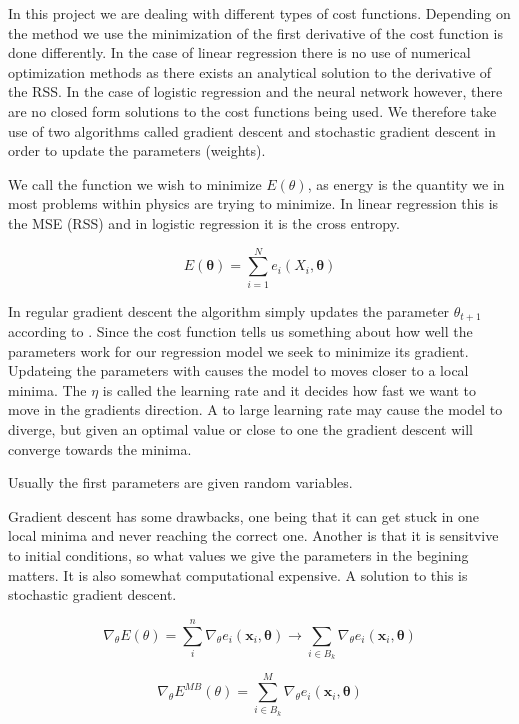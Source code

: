 In this project we are dealing with different types of cost functions. Depending on the method we use the minimization of the first derivative of the cost function is done differently. In the case of linear regression there is no use of numerical optimization methods as there exists an analytical solution to the derivative of the RSS. In the case of logistic regression and the neural network however, there are no closed form solutions to the cost functions being used. We therefore take use of two algorithms called gradient descent and stochastic gradient descent in order to update the parameters (weights).

We call the function we wish to minimize $E(\theta)$, as energy is the quantity we in most problems within physics are trying to minimize. In linear regression this is the MSE (RSS) and in logistic regression it is the cross entropy. 

\begin{equation}
E(\mathbf{\theta}) = \sum_{i=1}^N e_i(X_i, \mathbf{\theta}) 
\end{equation}


In regular gradient descent the algorithm simply updates the parameter $\theta_{t+1}$ according to . Since the cost function tells us something about how well the parameters work for our regression model we seek to minimize its gradient. Updateing the parameters with  causes the model to moves closer to a local minima. The $\eta$ is called the learning rate and it decides how fast we want to move in the gradients direction. A to large learning rate may cause the model to diverge, but given an optimal value or close to one the gradient descent will converge towards the minima.  

Usually the first parameters are given random variables. 

Gradient descent has some drawbacks, one being that it can get stuck in one local minima and never reaching the correct one. Another is that it is sensitvive to initial conditions, so what values we give the parameters in the begining matters. It is also somewhat computational expensive. A solution to this is stochastic gradient descent.  

\begin{equation}
\nabla_{\theta} E(\theta) = \sum_i^n \nabla_{\theta} e_i(\mathbf{x}_i, \mathbf{\theta}) \longrightarrow \sum_{i \in B_k} \nabla_{\theta} e_i(\mathbf{x}_i, \mathbf{\theta})
\end{equation}

\begin{equation}
\nabla_{\theta} E^{MB} (\theta) = \sum_{i \in B_k}^M \nabla_{\theta} e_i(\mathbf{x}_i, \mathbf{\theta})
\end{equation}

